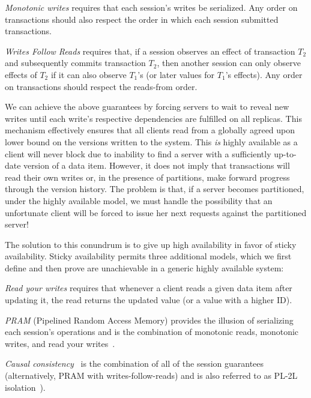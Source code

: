 \vspace{.5em}\noindent\textit{{Monotonic writes}} requires that
each session's writes be serialized. Any order on transactions should
also respect the order in which each session submitted transactions.

\vspace{.5em}\noindent\textit{{Writes Follow Reads}} requires that, if
a session observes an effect of transaction $T_2$ and subsequently
commits transaction $T_2$, then another session can only observe
effects of $T_2$ if it can also observe $T_1$'s (or later values for
$T_1$'s effects). Any order on transactions should respect the
reads-from order.\vspace{.5em}

We can achieve the above guarantees by forcing servers to wait to
reveal new writes until each write's respective dependencies are
fulfilled on all replicas. This mechanism effectively ensures that all
clients read from a globally agreed upon lower bound on the versions
written to the system. This \textit{is} highly available as a client
will never block due to inability to find a server with a sufficiently
up-to-date version of a data item. However, it does not imply that
transactions will read their own writes or, in the presence of
partitions, make forward progress through the version history. The
problem is that, if a server becomes partitioned, under the highly
available model, we must handle the possibility that an unfortunate
client will be forced to issue her next requests against the
partitioned server!

The solution to this conundrum is to give up high availability in
favor of sticky availability. Sticky availability permits three
additional models, which we first define and then prove are
unachievable in a generic highly available system:

\vspace{.5em}\noindent\textit{{Read your writes}} requires
that whenever a client reads a given data item after updating it, the
read returns the updated value (or a value with a higher ID).

\vspace{.5em}\noindent\textit{{PRAM}} (Pipelined Random Access
Memory) provides the illusion of serializing each session's operations
and is the combination of monotonic reads, monotonic writes, and read
your writes~\cite{herlihy-art}.

\vspace{.5em}\noindent\textit{{Causal
    consistency}}~\cite{causalmemory} is the combination of all of the
session guarantees~\cite{sessiontocausal} (alternatively, PRAM with
writes-follow-reads) and is also referred to as PL-2L
isolation~\cite{adya}).\vspace{.5em}

